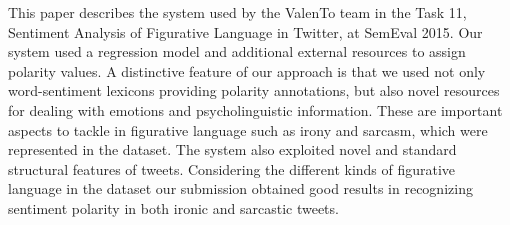 This paper describes the system used by the ValenTo team in the Task 11, Sentiment Analysis of Figurative Language in Twitter, at SemEval 2015. Our system used a regression model and additional external resources to assign polarity values. A distinctive feature of our approach is that we used not only word-sentiment lexicons providing polarity annotations, but also novel resources for dealing with emotions and psycholinguistic information. These are important aspects to tackle in figurative language such as irony and sarcasm, which were represented in the dataset. The system also exploited novel and standard structural features of tweets. Considering the different kinds of figurative language in the dataset our submission obtained good results in recognizing sentiment polarity in both ironic and sarcastic tweets.
